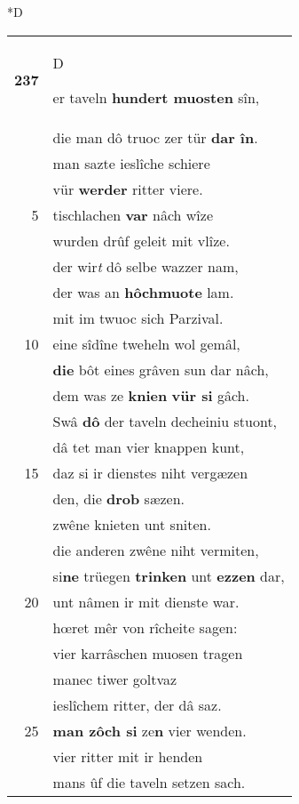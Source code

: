\documentclass[8pt,a4paper,notitlepage]{article}
\begin{document}
\begin{table}[ht]
\begin{minipage}[t]{0.5\linewidth}
\small
\begin{center}*D
\end{center}
\begin{tabular}{rl}
\textbf{237} & \begin{large}D\end{large}er taveln \textbf{hundert muosten} sîn,\\ 
 & die man dô truoc zer tür \textbf{dar în}.\\ 
 & man sazte ieslîche schiere\\ 
 & vür \textbf{werder} ritter viere.\\ 
5 & tischlachen \textbf{var} nâch wîze\\ 
 & wurden drûf geleit mit vlîze.\\ 
 & der wir\textit{t} dô selbe wazzer nam,\\ 
 & der was an \textbf{hôchmuote} lam.\\ 
 & mit im twuoc sich Parzival.\\ 
10 & eine sîdîne tweheln wol gemâl,\\ 
 & \textbf{die} bôt eines grâven sun dar nâch,\\ 
 & dem was ze \textbf{knien} \textbf{vür si} gâch.\\ 
 & Swâ \textbf{dô} der taveln decheiniu stuont,\\ 
 & dâ tet man vier knappen kunt,\\ 
15 & daz si ir dienstes niht vergæzen\\ 
 & den, die \textbf{drob} sæzen.\\ 
 & zwêne knieten unt sniten.\\ 
 & die anderen zwêne niht vermiten,\\ 
 & si\textbf{ne} trüegen \textbf{trinken} unt \textbf{ezzen} dar,\\ 
20 & unt nâmen ir mit dienste war.\\ 
 & hœret mêr von rîcheite sagen:\\ 
 & vier karrâschen muosen tragen\\ 
 & manec tiwer goltvaz\\ 
 & ieslîchem ritter, der dâ saz.\\ 
25 & \textbf{man zôch si} ze\textbf{n} vier wenden.\\ 
 & vier ritter mit ir henden\\ 
 & mans ûf die taveln setzen sach.\\ 

\end{tabular}
\end{minipage}
\end{table}
\end{document}
